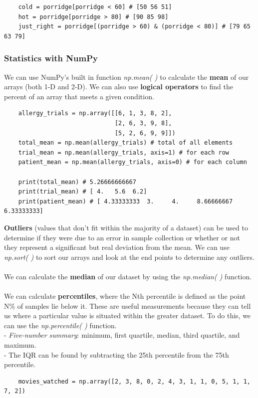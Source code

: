 \documentclass[11pt, a4paper]{article}
\begin{document}
\begin{spacing}{1.1}
\begin{lstlisting}
	cold = porridge[porridge < 60] # [50 56 51]
	hot = porridge[porridge > 80] # [90 85 98]
	just_right = porridge[(porridge > 60) & (porridge < 80)] # [79 65 63 79] \end{lstlisting}\vspace*{4mm}
	
	\subsubsection{Statistics with NumPy}
	We can use NumPy's built in function \textit{np.mean( )} to calculate the \textbf{mean} of our arrays (both 1-D and 2-D). We can also use \textbf{logical operators} to find the percent of an array that meets a given condition.
	\begin{lstlisting}
	allergy_trials = np.array([[6, 1, 3, 8, 2], 
	                           [2, 6, 3, 9, 8], 
	                           [5, 2, 6, 9, 9]])
	total_mean = np.mean(allergy_trials) # total of all elements
	trial_mean = np.mean(allergy_trials, axis=1) # for each row
	patient_mean = np.mean(allergy_trials, axis=0) # for each column
	
	print(total_mean) # 5.26666666667
	print(trial_mean) # [ 4.   5.6  6.2]
	print(patient_mean)	# [ 4.33333333  3.     4.     8.66666667  6.33333333] \end{lstlisting} \newpage
	
	\noindent \textbf{Outliers} (values that don’t fit within the majority of a dataset) can be used to determine if they were due to an error in sample collection or whether or not they represent a significant but real deviation from the mean. We can use \textit{np.sort( )} to sort our arrays and look at the end points to determine any outliers. \\~\\
	We can calculate the \textbf{median} of our dataset by using the \textit{np.median( )} function. \\~\\
	We can calculate \textbf{percentiles}, where the Nth percentile is defined as the point N\% of samples lie below it. These are useful measurements because they can tell us where a particular value is situated within the greater dataset. To do this, we can use the \textit{np.percentile( )} function. \\
	\hspace*{3mm} - \textit{Five-number summary}: minimum, first quartile, median, third quartile, and maximum. \\
	\hspace*{3mm} - The IQR can be found by subtracting the 25th percentile from the 75th percentile.
	\begin{lstlisting}
	movies_watched = np.array([2, 3, 8, 0, 2, 4, 3, 1, 1, 0, 5, 1, 1, 7, 2])
	

\end{lstlisting}
\end{spacing}
\end{document}
